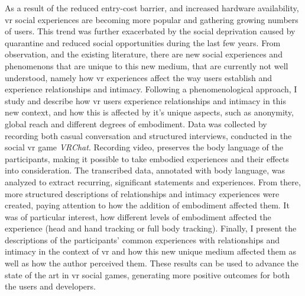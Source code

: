 



As a result of the reduced entry-cost barrier, and increased hardware availability, \Gls{vr} social experiences are becoming more popular and gathering growing numbers of users.
This trend was further exacerbated by the social deprivation caused by quarantine and reduced social opportunities during the last few years. 
From observation, and the existing literature, there are new social experiences and phenomenons that are unique to this new medium, that are currently not well understood, namely how \gls{vr} experiences affect the way users establish and experience relationships and intimacy. 
Following a phenomenological approach, I study and describe how \gls{vr} users experience relationships and intimacy in this new context, and how this is affected by it's unique aspects, such as anonymity, global reach and different degrees of embodiment.
Data was collected by recording both casual conversation and structured interviews, conducted in the social \gls{vr} game \emph{VRChat}.
Recording video, preserves the body language of the participants, making it possible to take embodied experiences and their effects into consideration. 
The transcribed data, annotated with body language, was analyzed to extract recurring, significant statements and experiences.
From there, more structured descriptions of relationships and intimacy experiences were created, paying attention to how the addition of embodiment affected them. It was of particular interest, how different levels of embodiment affected the experience (\eg head and hand tracking or full body tracking).
Finally, I present the descriptions of the participants' common experiences with relationships and intimacy in the context of \gls{vr} and how this new unique medium affected them as well as how the author perceived them.
These results can be used to advance the state of the art in \gls{vr} social games, generating more positive outcomes for both the users and developers.




